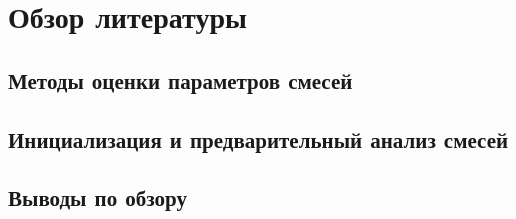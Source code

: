 
\section{Обзор литературы}
\label{sec:relatedworks}

\subsection{Методы оценки параметров смесей}

\subsection{Инициализация и предварительный анализ смесей}

\subsection{Выводы по обзору}
